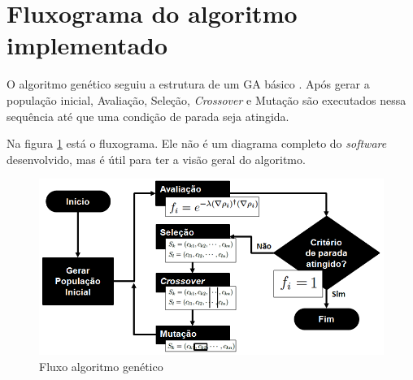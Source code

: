 \section{Fluxograma do algoritmo implementado}

	O algoritmo genético seguiu a estrutura de um GA básico \cite{Mitchell98, Linden2008}. Após gerar a população inicial, Avaliação, Seleção, \emph{Crossover} e Mutação são executados nessa sequência até que uma condição de parada seja atingida.
	
	Na figura \ref{fig:fluxo} está o fluxograma. Ele não é um diagrama completo do \emph{software} desenvolvido, mas é útil para ter a visão geral do algoritmo.

\begin{figure}[htbp]
	\centering
		\includegraphics[width=1.00\textwidth]{figs/materiais_metodo/autovalores_com_ga/fluxo.png}
	\caption{Fluxo algoritmo genético}
	\label{fig:fluxo}
\end{figure}